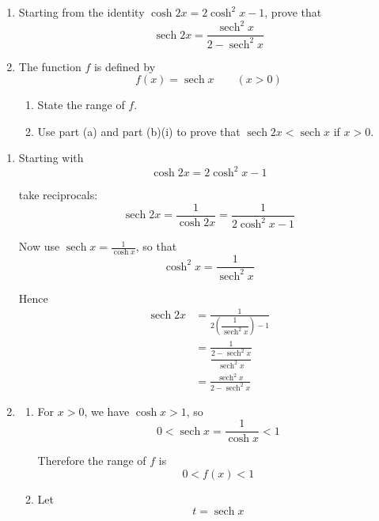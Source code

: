 \documentclass[leqno]{article}
\begin{document}
\begin{enumerate}[
  label=\textbf{\arabic*.},
  leftmargin=*,
  topsep=0pt,
  partopsep=0pt,
  parsep=0pt
]
\begin{enumerate}[label=\textbf{(\alph*)}]
  \item Starting from the identity $\cosh 2x = 2\cosh^2 x - 1$, prove that
  \[
  \operatorname{sech} 2x = \frac{\operatorname{sech}^2 x}{2-\operatorname{sech}^2 x}
  \]
  \item The function $f$ is defined by
  \[
  f(x)=\operatorname{sech} x \qquad (x>0)
  \]
  \begin{enumerate}[label=(\roman*)]
    \item State the range of $f$. 
    \item Use part (a) and part (b)(i) to prove that $\operatorname{sech} 2x<\operatorname{sech} x$ if $x>0$.  \\
  \end{enumerate}
\end{enumerate}

\vspace*{10pt}

\begin{djsSolution}
\begin{enumerate}[label=\textbf{(\alph*)}]
  \item Starting with
  \[
  \cosh 2x = 2\cosh^2 x - 1
  \]

  take reciprocals:
  \[
  \operatorname{sech} 2x=\frac{1}{\cosh 2x}=\frac{1}{2\cosh^2 x-1}
  \]

  Now use \(\operatorname{sech} x=\frac{1}{\cosh x}\), so that
  \[
  \cosh^2 x=\frac{1}{\operatorname{sech}^2 x}
  \]

  Hence
  \begin{align*}
  \operatorname{sech} 2x
  &=\frac{1}{2\left(\dfrac{1}{\operatorname{sech}^2 x}\right)-1} \\
  &=\frac{1}{\dfrac{2-\operatorname{sech}^2 x}{\operatorname{sech}^2 x}} \\
  &=\frac{\operatorname{sech}^2 x}{2-\operatorname{sech}^2 x}
  \end{align*}

  \item
  \begin{enumerate}[label=(\roman*)]
    \item For \(x>0\), we have \(\cosh x>1\), so
    \[
    0<\operatorname{sech} x=\frac{1}{\cosh x}<1
    \]

    Therefore the range of \(f\) is
    \[
    0<f(x)<1
    \]

    \item Let
    \[
    t=\operatorname{sech} x
    \]


\end{enumerate}
\end{enumerate}
\end{djsSolution}
\end{enumerate}
\end{document}
